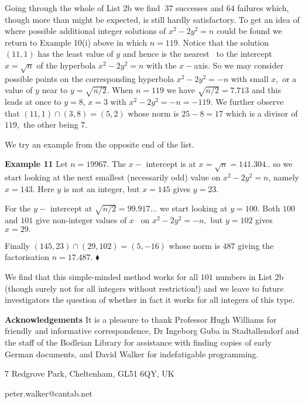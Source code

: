 \documentclass[12pt]{article}
\begin{document}
Going through the whole of List 2b we find $\ 37$ successes and $64$
failures which, though more than might be expected, is still hardly
satisfactory. To get an idea of where possible additional integer solutions
of $x^{2}-2y^{2}=n$ could be found we return to Example 10(i) above in which 
$n=119.$ Notice that the solution $\left( 11,1\right) $ has the least value
of $y$ and hence is the nearest \ to the intercept $x=\sqrt{n}$ of the
hyperbola $x^{2}-2y^{2}=n$ with the $x-$axis. So we may consider possible
points on the corresponding hyperbola $x^{2}-2y^{2}=-n$ with small $x,$ or a
value of $y$ near to $y=\sqrt{n/2}.$ When $n=119$ we have $\sqrt{n/2}=7.713$
and this leads at once to $y=8$, $x=3$ with $x^{2}-2y^{2}=-n=-119.$ We
further observe that $\left( 11,1\right) \cap \left( 3,8\right) =\left(
5,2\right) $ whose norm is $25-8=17$ which is a divisor of $119,$ the other
being $7.$

We try an example from the opposite end of the list.

\textbf{Example 11} Let $n=19967.$ The $x-$ intercept is at $x=\sqrt{n}%
=141.304..$ so we start looking at the next smallest (necessarily odd) value
on $x^{2}-2y^{2}=n$, namely $x=143.$ Here $y$ is not an integer, but $x=145$
gives $y=23.$

For the $y-$ intercept at $\sqrt{n/2}=99.917...$ we start looking at $y=100.$
Both $100$ and $101$ give non-integer values of $x$ \ on $x^{2}-2y^{2}=-n,$
but $y=102$ gives $x=29.$

Finally $\left( 145,23\right) \cap \left( 29,102\right) =\left( 5,-16\right) 
$ whose norm is $487$ giving the factorisation $n=17.487.$ $\blacklozenge $

We find that this simple-minded method works for all $101$ numbers in List
2b (though surely not for all integers without restriction!) and we leave to
future investigators the question of whether in fact it works for all
integers of this type.

\textbf{Acknowledgements} It is a pleasure to thank Professor Hugh Williams
for friendly and informative correspondence, Dr Ingeborg Guba in
Stadtallendorf and the staff of the Bodleian Library for assistance with
finding copies of early German documents, and David Walker for indefatigable
programming.

\bigskip

7 Redgrove Park, Cheltenham, GL51 6QY, UK

\bigskip

peter.walker@cantab.net

\printbibliography
\end{document}
